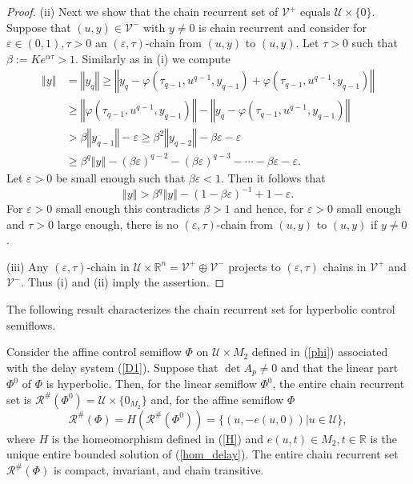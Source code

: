 \documentclass{siamltex}%
\begin{document}
\begin{proof}
(ii) Next we show that the chain recurrent set of $\mathcal{V}^{+}$ equals
$\mathcal{U}\times\{0\}$. Suppose that $(u,y)\in\mathcal{V}^{-}$ with
$y\not =0$ is chain recurrent and consider for $\varepsilon\in(0,1),\tau>0$ an
$(\varepsilon,\tau)$-chain from $(u,y)$ to $(u,y)$. Let $\tau>0$ such that
$\beta:=Ke^{\alpha\tau}>1$. Similarly as in (i) we compute%
\begin{align*}
\left\Vert y\right\Vert  &  =\left\Vert y_{q}\right\Vert \geq\left\Vert
y_{q}-\varphi(\tau_{q-1},u^{q-1},y_{q-1})+\varphi(\tau_{q-1},u^{q-1}%
,y_{q-1})\right\Vert \\
&  \geq\left\Vert \varphi(\tau_{q-1},u^{q-1},y_{q-1})\right\Vert -\left\Vert
y_{q}-\varphi(\tau_{q-1},u^{q-1},y_{q-1})\right\Vert \\
&  >\beta\left\Vert y_{q-1}\right\Vert -\varepsilon\geq\beta^{2}\left\Vert
y_{q-2}\right\Vert -\beta\varepsilon-\varepsilon\\
&  \geq\beta^{q}\left\Vert y\right\Vert -(\beta\varepsilon)^{q-2}%
-(\beta\varepsilon)^{q-3}-\cdots-\beta\varepsilon-\varepsilon.
\end{align*}
Let $\varepsilon>0$ be small enough such that $\beta\varepsilon<1$. Then it
follows that%
\[
\left\Vert y\right\Vert >\beta^{q}\left\Vert y\right\Vert -(1-\beta
\varepsilon)^{-1}+1-\varepsilon.
\]
For $\varepsilon>0$ small enough this contradicts $\beta>1$ and hence, for
$\varepsilon>0$ small enough and $\tau>0$ large enough, there is no
$(\varepsilon,\tau)$-chain from $(u,y)$ to $(u,y)$ if $y\not =0$.

(iii) Any $(\varepsilon,\tau)$-chain in $\mathcal{U}\times\mathbb{R}%
^{n}=\mathcal{V}^{+}\oplus\mathcal{V}^{-}$ projects to $(\varepsilon,\tau)$
chains in $\mathcal{V}^{+}$ and $\mathcal{V}^{-}$. Thus (i) and (ii) imply the assertion.
\end{proof}

The following result characterizes the chain recurrent set for hyperbolic
control semiflows.

\begin{theorem}
\label{Theorem_hyperbolic1}Consider the affine control semiflow $\Phi$ on
$\mathcal{U}\times M_{2}$ defined in (\ref{phi}) associated with the delay
system (\ref{D1}). Suppose that $\det A_{p}\not =0$ and that the linear part
$\Phi^{0}$ of $\Phi$ is hyperbolic. Then, for the linear semiflow $\Phi^{0}$,
the entire chain recurrent set is $\mathcal{R}^{\#}(\Phi^{0})=\mathcal{U}%
\times\{0_{M_{2}}\}$ and, for the affine semiflow $\Phi$%
\[
\mathcal{R}^{\#}(\Phi)=H(\mathcal{R}^{\#}(\Phi^{0}))=\{(u,-e(u,0))\left\vert
u\in\mathcal{U}\right.  \},
\]
where $H$ is the homeomorphism defined in (\ref{H}) and $e(u,t)\in M_{2}%
,t\in\mathbb{R}$ is the unique entire bounded solution of (\ref{hom_delay}).
The entire chain recurrent set $\mathcal{R}^{\#}(\Phi)$ is compact, invariant,
and chain transitive.
\end{theorem}
\end{document}
